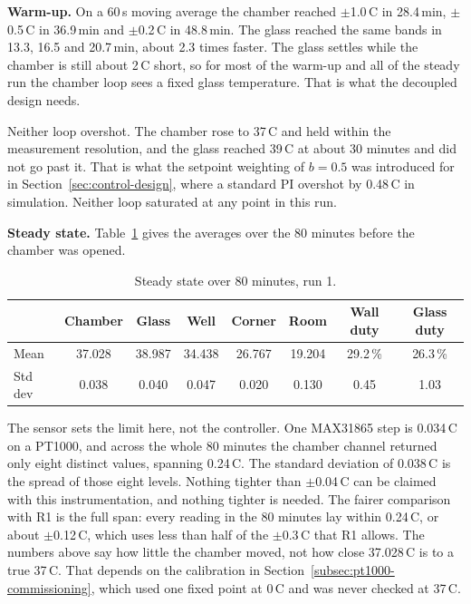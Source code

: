 \textbf{Warm-up.} On a 60\,s moving average the chamber reached $\pm$1.0\,\textdegree{}C in 28.4\,min, $\pm$0.5\,\textdegree{}C in 36.9\,min and $\pm$0.2\,\textdegree{}C in 48.8\,min. The glass reached the same bands in 13.3, 16.5 and 20.7\,min, about 2.3 times faster. The glass settles while the chamber is still about 2\,\textdegree{}C short, so for most of the warm-up and all of the steady run the chamber loop sees a fixed glass temperature. That is what the decoupled design needs.


Neither loop overshot. The chamber rose to 37\,\textdegree{}C and held within the measurement resolution, and the glass reached 39\,\textdegree{}C at about 30 minutes and did not go past it. That is what the setpoint weighting of $b = 0.5$ was introduced for in Section~\ref{sec:control-design}, where a standard PI overshot by 0.48\,\textdegree{}C in simulation. Neither loop saturated at any point in this run.

\textbf{Steady state.} Table~\ref{tab:cl-test1-steady} gives the averages over the 80 minutes before the chamber was opened.

\begin{table}[htbp]
    \centering
    \caption{Steady state over 80 minutes, run 1.}
    \label{tab:cl-test1-steady}
    \small
    \begin{tabular}{lccccccc}
        \toprule
         & \textbf{Chamber} & \textbf{Glass} & \textbf{Well} & \textbf{Corner} & \textbf{Room} & \textbf{Wall duty} & \textbf{Glass duty} \\
        \midrule
        Mean    & 37.028 & 38.987 & 34.438 & 26.767 & 19.204 & 29.2\,\% & 26.3\,\% \\
        Std dev & 0.038  & 0.040  & 0.047  & 0.020  & 0.130  & 0.45     & 1.03 \\
        \bottomrule
    \end{tabular}
\end{table}

The sensor sets the limit here, not the controller. One MAX31865 step is 0.034\,\textdegree{}C on a PT1000, and across the whole 80 minutes the chamber channel returned only eight distinct values, spanning 0.24\,\textdegree{}C. The standard deviation of 0.038\,\textdegree{}C is the spread of those eight levels. Nothing tighter than $\pm$0.04\,\textdegree{}C can be claimed with this instrumentation, and nothing tighter is needed. The fairer comparison with R1 is the full span: every reading in the 80 minutes lay within 0.24\,\textdegree{}C, or about $\pm$0.12\,\textdegree{}C, which uses less than half of the $\pm$0.3\,\textdegree{}C that R1 allows. The numbers above say how little the chamber moved, not how close 37.028\,\textdegree{}C is to a true 37\,\textdegree{}C. That depends on the calibration in Section~\ref{subsec:pt1000-commissioning}, which used one fixed point at 0\,\textdegree{}C and was never checked at 37\,\textdegree{}C.

